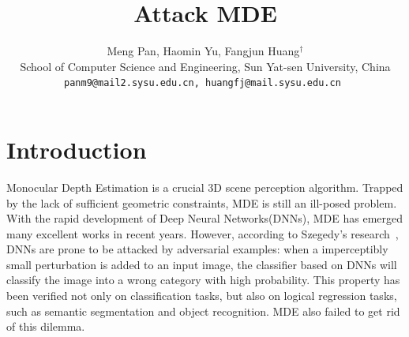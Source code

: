 \documentclass[10pt,twocolumn,letterpaper]{article}
\begin{document}
\title{Attack MDE}

\author{Meng Pan, Haomin Yu, Fangjun Huang$^\dagger$\\
 School of Computer Science and Engineering, 
Sun Yat-sen University, China\\
{\tt\small panm9@mail2.sysu.edu.cn, huangfj@mail.sysu.edu.cn
}}
\maketitle
\def\thefootnote{$\dagger$}\def\thefootnote{\arabic{footnote}}

\begin{abstract}
\end{abstract}

\section{Introduction}
Monocular Depth Estimation is a crucial 3D scene perception algorithm. 
Trapped by the lack of sufficient geometric constraints, 
MDE is still an ill-posed problem. With the rapid development of 
Deep Neural Networks(DNNs), MDE has emerged many excellent works 
in recent years. However, according to Szegedy's 
research~\cite{Szegedy_2014_ICLR}, DNNs are 
prone to be attacked by adversarial examples: when a imperceptibly 
small perturbation is added to an input image, the classifier 
based on DNNs will classify the image into a wrong category with high probability. 
This property has been verified not only on classification tasks, 
but also on logical regression tasks, such as semantic segmentation and 
object recognition. MDE also failed to get rid of this dilemma.
\end{document}
